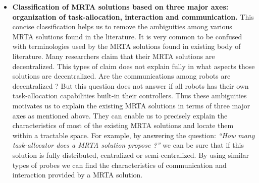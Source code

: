 \begin{itemize}
\item \textbf{Classification of MRTA solutions based on three major axes: organization of task-allocation, interaction and communication.} This concise classification helps us to remove the ambiguities among various MRTA solutions found in the literature.  It is very common to be confused with terminologies used by the MRTA solutions found in existing body of literature. Many researchers claim that their MRTA solutions are decentralized. This types of claim does not explain fully in what aspects those solutions are decentralized. Are the communications among robots are decentralized ? But this question does not answer if all robots has their own task-allocation capabilities built-in their controllers. Thus these ambiguities motivates us to explain the existing MRTA solutions in terms of three major axes as mentioned above. They can enable us to precisely  explain the characteristics of most of the existing MRTA solutions and locate them within a tractable space. For example, by answering the question: \textit{``How many task-allocator does a MRTA solution propose ?''} we can be sure that if this solution is fully distributed, centralized or semi-centralized. By using similar types of probes we can find the characteristics of communication and interaction provided by a MRTA solution.
\end{itemize}
